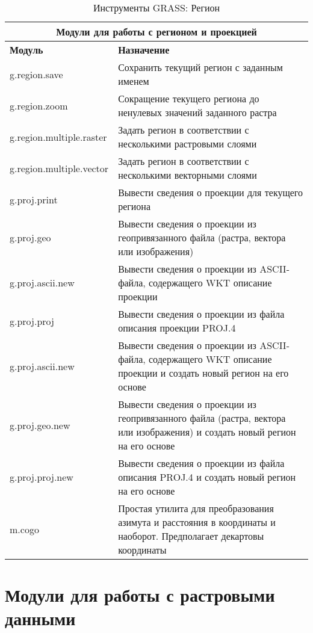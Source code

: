 {\renewcommand{\arraystretch}{0.7}
\begin{table}[H]
\centering
 \begin{tabular}{|p{4cm}|p{11cm}|}
  \hline \multicolumn{2}{|c|}{\textbf{Модули для работы с регионом и проекцией}} \\
  \hline \textbf{Модуль} & \textbf{Назначение} \\
  \hline g.region.save & Сохранить текущий регион с заданным именем \\
  \hline g.region.zoom & Сокращение текущего региона до ненулевых значений
  заданного растра \\
  \hline g.region.multiple.raster & Задать регион в соответствии с
  несколькими растровыми слоями \\
  \hline g.region.multiple.vector & Задать регион в соответствии с
  несколькими векторными слоями \\
  \hline g.proj.print & Вывести сведения о проекции для текущего региона \\
  \hline g.proj.geo & Вывести сведения о проекции из геопривязанного
  файла (растра, вектора или изображения) \\
  \hline g.proj.ascii.new & Вывести сведения о проекции из
  ASCII-файла, содержащего WKT описание проекции \\
  \hline g.proj.proj & Вывести сведения о проекции из файла описания
  проекции PROJ.4 \\
  \hline g.proj.ascii.new & Вывести сведения о проекции из ASCII-файла,
  содержащего WKT описание проекции и создать новый регион на его основе \\
  \hline g.proj.geo.new & Вывести сведения о проекции из геопривязанного
  файла (растра, вектора или изображения) и создать новый регион на его
  основе \\
  \hline g.proj.proj.new & Вывести сведения о проекции из файла описания
  PROJ.4 и создать новый регион на его основе \\
  \hline m.cogo & Простая утилита для преобразования азимута и расстояния
  в координаты и наоборот. Предполагает декартовы координаты \\
\hline
\end{tabular}
\caption{Инструменты GRASS: Регион}
\end{table}}


\section{Модули для работы с растровыми данными}

